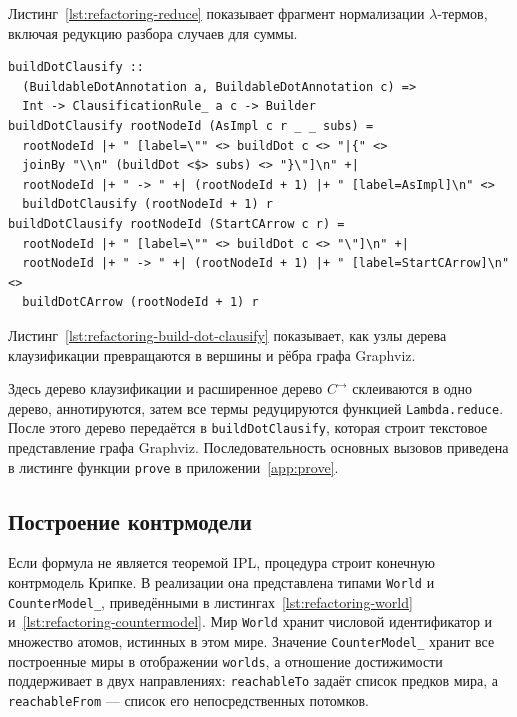 \documentclass[14pt, russian]{scrartcl}
\begin{document}
Листинг~\ref{lst:refactoring-reduce} показывает фрагмент нормализации
$\lambda$-термов, включая редукцию разбора случаев для суммы.

\begin{listing}[!htb]
\caption{Фрагмент функции визуализации \texttt{buildDotClausify}}
\label{lst:refactoring-build-dot-clausify}
\begin{verbatim}
buildDotClausify ::
  (BuildableDotAnnotation a, BuildableDotAnnotation c) =>
  Int -> ClausificationRule_ a c -> Builder
buildDotClausify rootNodeId (AsImpl c r _ _ subs) = 
  rootNodeId |+ " [label=\"" <> buildDot c <> "|{" <>
  joinBy "\\n" (buildDot <$> subs) <> "}\"]\n" +|
  rootNodeId |+ " -> " +| (rootNodeId + 1) |+ " [label=AsImpl]\n" <>
  buildDotClausify (rootNodeId + 1) r
buildDotClausify rootNodeId (StartCArrow c r) = 
  rootNodeId |+ " [label=\"" <> buildDot c <> "\"]\n" +|
  rootNodeId |+ " -> " +| (rootNodeId + 1) |+ " [label=StartCArrow]\n" <>
  buildDotCArrow (rootNodeId + 1) r
\end{verbatim}
\end{listing}

Листинг~\ref{lst:refactoring-build-dot-clausify} показывает, как узлы дерева
клаузификации превращаются в вершины и рёбра графа Graphviz.

Здесь дерево клаузификации и расширенное дерево $C^{\rightarrow}$
склеиваются в одно дерево, аннотируются, затем все термы редуцируются функцией
\texttt{Lambda.reduce}. После этого дерево передаётся в \texttt{buildDotClausify},
которая строит текстовое представление графа Graphviz. Последовательность
основных вызовов приведена в листинге функции \texttt{prove} в
приложении~\ref{app:prove}.

\subsection{Построение контрмодели}

Если формула не является теоремой IPL, процедура строит конечную контрмодель
Крипке. В реализации она представлена типами \texttt{World} и
\texttt{CounterModel\_}, приведёнными в листингах~\ref{lst:refactoring-world}
и~\ref{lst:refactoring-countermodel}. Мир \texttt{World} хранит числовой
идентификатор и множество атомов, истинных в этом мире. Значение
\texttt{CounterModel\_} хранит все построенные миры в отображении
\texttt{worlds}, а отношение достижимости поддерживает в двух направлениях:
\texttt{reachableTo} задаёт список предков мира, а \texttt{reachableFrom} ---
список его непосредственных потомков.
\end{document}
